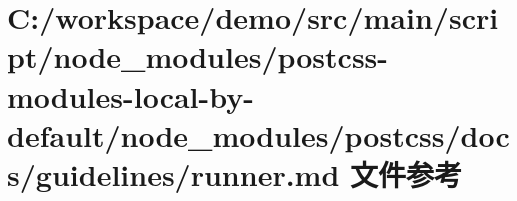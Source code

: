 \hypertarget{postcss-modules-local-by-default_2node__modules_2postcss_2docs_2guidelines_2runner_8md}{}\section{C\+:/workspace/demo/src/main/script/node\+\_\+modules/postcss-\/modules-\/local-\/by-\/default/node\+\_\+modules/postcss/docs/guidelines/runner.md 文件参考}
\label{postcss-modules-local-by-default_2node__modules_2postcss_2docs_2guidelines_2runner_8md}
